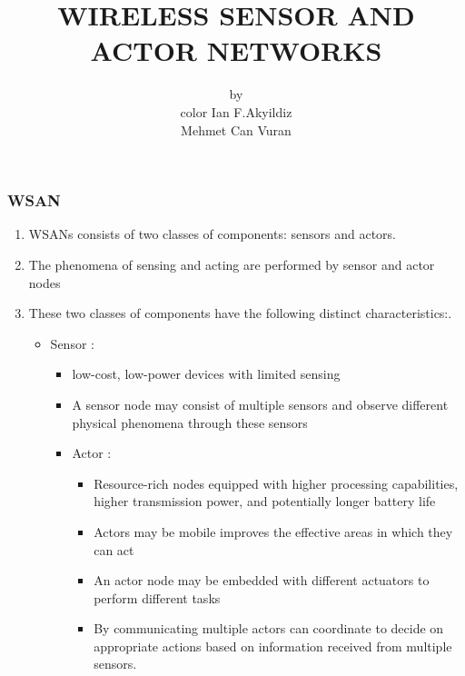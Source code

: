 \documentclass[11pt]{class}
\author [Mumtaj]{\scriptsize by \\[1cm] color Ian F.Akyildiz \\Mehmet Can Vuran}
\title{WIRELESS SENSOR AND ACTOR NETWORKS}
\begin{document}
	\maketitle
	
	\begin{frame}
		\frametitle{WSAN}
		\begin{enumerate}
			\item   WSANs consists of two classes of components: sensors and actors.
			\item  The phenomena of sensing and acting are performed by sensor and actor nodes
			\item  These two classes of components have the following distinct characteristics:.
			\begin{itemize}
			\item Sensor :
				\begin{itemize}
					\item low-cost, low-power devices with limited sensing
				    \item A sensor node may consist of multiple sensors and observe
				    different physical phenomena through these sensors
			\item Actor :
				\begin{itemize}
					\item Resource-rich nodes equipped with higher processing capabilities, higher transmission power, and potentially longer battery life
					\item Actors may be mobile improves the effective areas in which they can act
					\item An actor node may be embedded with different actuators to perform different tasks
					\item By communicating multiple actors can coordinate to decide on appropriate actions based on information received from multiple sensors.
				\end{itemize}
			\end{itemize}
		\end{itemize}
		
				
			\end{enumerate}
			
		\end{frame}
\end{document}

